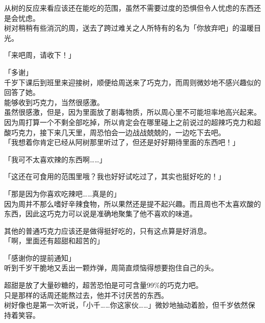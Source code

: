 从树的反应来看应该还在能吃的范围，虽然不需要过度的恐惧但令人忧虑的东西还是会忧虑。\\

树对稍稍有些消沉的周，送去了跨过难关之人所特有的名为「你放弃吧」的温暖目光。\\

\vspace{2\baselineskip}

「来吧周，请收下！」

「多谢」\\

千岁下课后到班里来迎接树，顺便给周送来了巧克力，而周则微妙地不感兴趣似的回答了她。\\

能够收到巧克力，当然很感激。\\

虽然很感激，但是，因为里面放了剧毒物质，所以周心里不可能坦率地高兴起来。\\

因为周打算一个不剩全部吃掉，所以肯定会在哪里碰上之前说过的超辣巧克力和超酸巧克力，接下来几天里，周恐怕会一边战战兢兢的，一边吃下去吧。\\

「我想着你肯定已经从阿树那里听过了，但还是好好期待里面的东西吧！」

「我可不太喜欢辣的东西啊……」

「这还在可食用的范围里哦？我也好好试吃过了，其实也挺好吃的！」

「那是因为你喜欢吃辣吧……真是的」\\

因为周并不那么嗜好辛辣食物，所以果然还是提不起兴趣。而且周也不太喜欢酸的东西，因此这巧克力可以说是准确地聚集了他不喜欢的味道。

其他的普通巧克力应该还是做得挺好吃的，只有这点算是好消息。\\

「啊，里面还有超甜和超苦的」

「感谢你的提前通知」\\

听到千岁干脆地又丢出一颗炸弹，周简直烦恼得想要抱住自己的头。

超甜是放了大量砂糖的，超苦恐怕是可可含量99\%的巧克力吧。\\

只是那样的话周还能熬过去，他并不讨厌苦的东西。\\

树好像也是第一次听说，「小千……你这家伙……」微妙地抽动着脸，但千岁依然保持着笑容。\\

